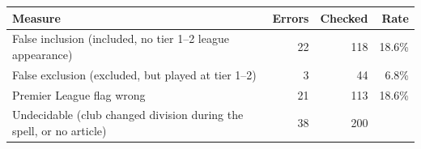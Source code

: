 \begin{tabular}{lrrr}
\toprule
Measure & Errors & Checked & Rate
\\
\midrule
False inclusion (included, no tier 1--2 league appearance) & 22 & 118 & 18.6\% \\
False exclusion (excluded, but played at tier 1--2) & 3 & 44 & 6.8\% \\
Premier League flag wrong & 21 & 113 & 18.6\% \\
Undecidable (club changed division during the spell, or no article) & 38 & 200 &  \\
\bottomrule
\end{tabular}
